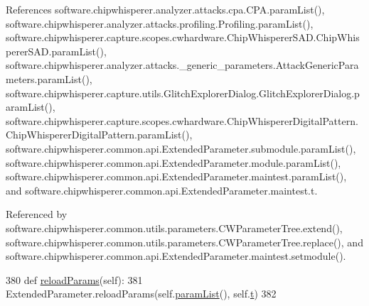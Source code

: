 References software.\+chipwhisperer.\+analyzer.\+attacks.\+cpa.\+C\+P\+A.\+param\+List(), software.\+chipwhisperer.\+analyzer.\+attacks.\+profiling.\+Profiling.\+param\+List(), software.\+chipwhisperer.\+capture.\+scopes.\+cwhardware.\+Chip\+Whisperer\+S\+A\+D.\+Chip\+Whisperer\+S\+A\+D.\+param\+List(), software.\+chipwhisperer.\+analyzer.\+attacks.\+\_\+generic\+\_\+parameters.\+Attack\+Generic\+Parameters.\+param\+List(), software.\+chipwhisperer.\+capture.\+utils.\+Glitch\+Explorer\+Dialog.\+Glitch\+Explorer\+Dialog.\+param\+List(), software.\+chipwhisperer.\+capture.\+scopes.\+cwhardware.\+Chip\+Whisperer\+Digital\+Pattern.\+Chip\+Whisperer\+Digital\+Pattern.\+param\+List(), software.\+chipwhisperer.\+common.\+api.\+Extended\+Parameter.\+submodule.\+param\+List(), software.\+chipwhisperer.\+common.\+api.\+Extended\+Parameter.\+module.\+param\+List(), software.\+chipwhisperer.\+common.\+api.\+Extended\+Parameter.\+maintest.\+param\+List(), and software.\+chipwhisperer.\+common.\+api.\+Extended\+Parameter.\+maintest.\+t.



Referenced by software.\+chipwhisperer.\+common.\+utils.\+parameters.\+C\+W\+Parameter\+Tree.\+extend(), software.\+chipwhisperer.\+common.\+utils.\+parameters.\+C\+W\+Parameter\+Tree.\+replace(), and software.\+chipwhisperer.\+common.\+api.\+Extended\+Parameter.\+maintest.\+setmodule().


\begin{DoxyCode}
380         \textcolor{keyword}{def }\hyperlink{classsoftware_1_1chipwhisperer_1_1common_1_1api_1_1ExtendedParameter_1_1maintest_ac04a77a66b50d1e1b9911b7ea29eddd6}{reloadParams}(self):
381             ExtendedParameter.reloadParams(self.\hyperlink{classsoftware_1_1chipwhisperer_1_1common_1_1api_1_1ExtendedParameter_1_1maintest_a606a166e28d055ecec331cb4172f9fe4}{paramList}(), self.\hyperlink{classsoftware_1_1chipwhisperer_1_1common_1_1api_1_1ExtendedParameter_1_1maintest_adf9172b5d72cabec43fbb73e5b4775d2}{t})
382 
\end{DoxyCode}
\hypertarget{classsoftware_1_1chipwhisperer_1_1common_1_1api_1_1ExtendedParameter_1_1maintest_a9430a1d756d2ae02be2202eeebce01c1}{}
